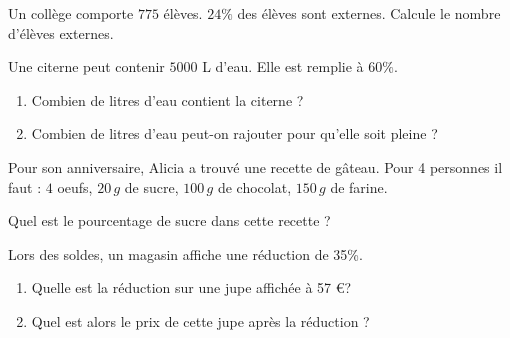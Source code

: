 \begin{pageParcoursd} 




Un collège comporte $775$ élèves. $24\%$ des élèves sont externes. Calcule le nombre d'élèves externes. 
 


 


Une citerne peut contenir $5000$ L d'eau. Elle est remplie à $60\%$.

\begin{enumerate}[leftmargin=*]
\item Combien de litres d'eau contient la citerne ? 
\item Combien de litres d'eau peut-on rajouter pour qu'elle soit pleine ? 
\end{enumerate}



Pour son anniversaire, Alicia a trouvé une recette de gâteau. Pour 4 personnes il faut : $4$ oeufs, $20\,g$ de sucre, $100\,g$ de chocolat, $150\,g$ de farine.

Quel est le pourcentage de sucre dans cette recette ? 



Lors des soldes, un magasin affiche une réduction de 35\%. 
\begin{enumerate}[leftmargin=*]
\item Quelle est la réduction sur une jupe affichée à 57 \euro ?
\item Quel est alors le prix de cette jupe après la réduction ?
\end{enumerate}


\end{pageParcoursd}
